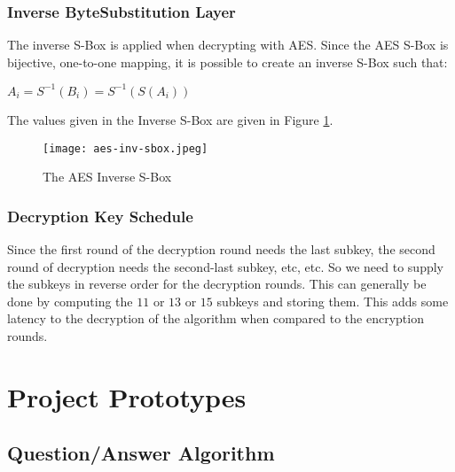\subsubsection{Inverse ByteSubstitution Layer}

The inverse S-Box is applied when decrypting with AES. Since the AES S-Box is bijective, one-to-one mapping, it is possible to create an inverse S-Box such that:

\begin{center}
$A_i = S^{-1}(B_i) = S^{-1}(S(A_i))$
\end{center}

The values given in the Inverse S-Box are given in Figure \ref{AES-InvS-BOX}.

\begin{figure}[H]
\begin{center}
\texttt{[image: aes-inv-sbox.jpeg]}
\end{center}
\caption{The AES Inverse S-Box}
\label{AES-InvS-BOX}
\end{figure}

\subsubsection{Decryption Key Schedule}

Since the first round of the decryption round needs the last subkey, the second round of decryption needs the second-last subkey, etc, etc. So we need to supply the subkeys in reverse order for the decryption rounds. This can generally be done by computing the $11$ or $13$ or $15$ subkeys and storing them. This adds some latency to the decryption of the algorithm when compared to the encryption rounds. 

\section{Project Prototypes}

\subsection{Question/Answer Algorithm}

